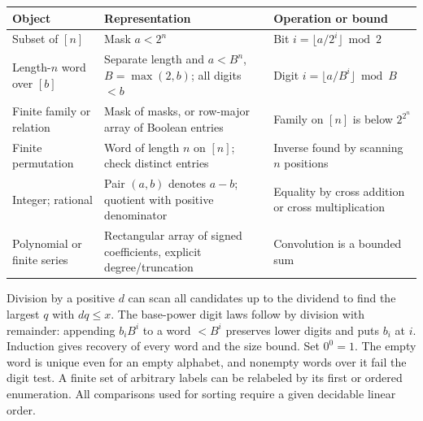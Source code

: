\begin{center}\small
\begin{tabular}{@{}p{.20\linewidth}p{.405\linewidth}p{.30\linewidth}@{}}\toprule
Object & Representation & Operation or bound\\\midrule
Subset of $[n]$ & Mask $a<2^n$ & Bit $i=\lfloor a/2^i\rfloor\bmod 2$\\
Length-$n$ word over $[b]$ & Separate length and $a<B^n$, $B=\max(2,b)$; all digits $<b$ & Digit $i=\lfloor a/B^i\rfloor\bmod B$\\
Finite family or relation & Mask of masks, or row-major array of Boolean entries & Family on $[n]$ is below $2^{2^n}$\\
Finite permutation & Word of length $n$ on $[n]$; check distinct entries & Inverse found by scanning $n$ positions\\
Integer; rational & Pair $(a,b)$ denotes $a-b$; quotient with positive denominator & Equality by cross addition or cross multiplication\\
Polynomial or finite series & Rectangular array of signed coefficients, explicit degree/truncation & Convolution is a bounded sum\\\bottomrule
\end{tabular}
\end{center}
Division by a positive $d$ can scan all candidates up to the dividend to find the largest $q$ with $dq\le x$. The base-power digit laws follow by division with remainder: appending $b_iB^i$ to a word $<B^i$ preserves lower digits and puts $b_i$ at $i$. Induction gives recovery of every word and the size bound. Set $0^0=1$. The empty word is unique even for an empty alphabet, and nonempty words over it fail the digit test. A finite set of arbitrary labels can be relabeled by its first or ordered enumeration. All comparisons used for sorting require a given decidable linear order.

